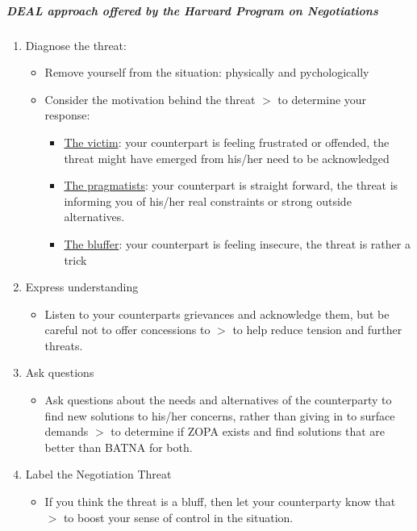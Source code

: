\subparagraph{DEAL approach offered by the Harvard Program on Negotiations}

\begin{enumerate}
    \item Diagnose the threat:
        \begin{itemize}
            \item Remove yourself from the situation: physically and pychologically
            \item Consider the motivation behind the threat $>$ to determine your response:
                \begin{itemize}
                    \item \underline{The victim}: your counterpart is feeling frustrated or offended,
                        the threat might have emerged from his/her need to be acknowledged
                    \item \underline{The pragmatists}: your counterpart is straight forward, the threat
                        is informing you of his/her real constraints or strong outside
                        alternatives.
                    \item \underline{The bluffer}: your counterpart is feeling insecure, the threat is
                        rather a trick
                \end{itemize}
        \end{itemize}
    \item Express understanding
        \begin{itemize}
            \item Listen to your counterparts grievances and acknowledge them,
                but be careful not to offer concessions to $>$ to help reduce tension
                and further threats.
        \end{itemize}
    \item Ask questions
        \begin{itemize}
            \item Ask questions about the needs and alternatives of the counterparty
            to find new solutions to his/her concerns, rather than giving in to
            surface demands $>$ to determine if ZOPA exists and find solutions that
            are better than BATNA for both.
        \end{itemize}
    \item Label the Negotiation Threat
        \begin{itemize}
            \item If you think the threat is a bluff, then let your counterparty
                know that $>$ to boost your sense of control in the situation.
        \end{itemize}
\end{enumerate}

